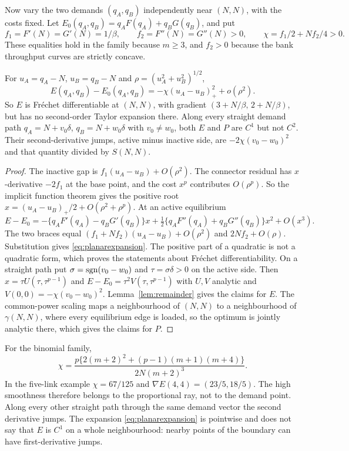 Now vary the two demands $(q_A,q_B)$ independently near $(N,N)$, with the costs fixed. Let $E_0(q_A,q_B)=q_AF(q_A)+q_BG(q_B)$, and put
\[
 f_1=F'(N)=G'(N)=1/\beta,\qquad f_2=F''(N)=G''(N)>0,\qquad \chi=f_1/2+Nf_2/4>0.
\]
These equalities hold in the family because $m\ge3$, and $f_2>0$ because the bank throughput curves are strictly concave.

\begin{proposition}\label{prop:anisotropy}
For $u_A=q_A-N$, $u_B=q_B-N$ and $\rho=(u_A^2+u_B^2)^{1/2}$,
\begin{equation}\label{eq:planarexpansion}
 E(q_A,q_B)-E_0(q_A,q_B)=-\chi(u_A-u_B)_+^2+o(\rho^2).
\end{equation}
So $E$ is Fr\'echet differentiable at $(N,N)$, with gradient $(3+N/\beta,\,2+N/\beta)$, but has no second-order Taylor expansion there. Along every straight demand path $q_A=N+v_0\delta$, $q_B=N+w_0\delta$ with $v_0\ne w_0$, both $E$ and $P$ are $C^1$ but not $C^2$. Their second-derivative jumps, active minus inactive side, are $-2\chi(v_0-w_0)^2$ and that quantity divided by $S(N,N)$.
\end{proposition}
\begin{proof}
The inactive gap is $f_1(u_A-u_B)+O(\rho^2)$. The connector residual has $x$-derivative $-2f_1$ at the base point, and the cost $x^p$ contributes $O(\rho^p)$. So the implicit function theorem gives the positive root $x=(u_A-u_B)_+/2+O(\rho^2+\rho^p)$. At an active equilibrium
\[
 E-E_0=-\{q_AF'(q_A)-q_BG'(q_B)\}x+\tfrac12\{q_AF''(q_A)+q_BG''(q_B)\}x^2+O(x^3).
\]
The two braces equal $(f_1+Nf_2)(u_A-u_B)+O(\rho^2)$ and $2Nf_2+O(\rho)$. Substitution gives \eqref{eq:planarexpansion}. The positive part of a quadratic is not a quadratic form, which proves the statements about Fr\'echet differentiability. On a straight path put $\sigma=\operatorname{sgn}(v_0-w_0)$ and $\tau=\sigma\delta>0$ on the active side. Then $x=\tau U(\tau,\tau^{p-1})$ and $E-E_0=\tau^2V(\tau,\tau^{p-1})$ with $U,V$ analytic and $V(0,0)=-\chi(v_0-w_0)^2$. Lemma~\ref{lem:remainder} gives the claims for $E$. The common-power scaling maps a neighbourhood of $(N,N)$ to a neighbourhood of $\gamma(N,N)$, where every equilibrium edge is loaded, so the optimum is jointly analytic there, which gives the claims for $P$.
\end{proof}

For the binomial family,
\[
 \chi=\frac{p\{2(m+2)^2+(p-1)(m+1)(m+4)\}}{2N(m+2)^3}.
\]
In the five-link example $\chi=67/125$ and $\nabla E(4,4)=(23/5,18/5)$. The high smoothness therefore belongs to the proportional ray, not to the demand point. Along every other straight path through the same demand vector the second derivative jumps. The expansion \eqref{eq:planarexpansion} is pointwise and does not say that $E$ is $C^1$ on a whole neighbourhood: nearby points of the boundary can have first-derivative jumps.

